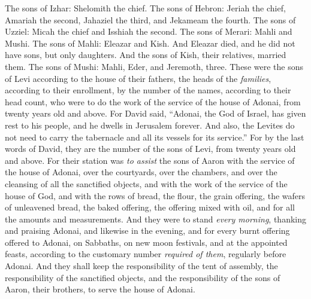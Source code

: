 \begin{biblechapter}
\verse The sons of Izhar: Shelomith the chief.
\verse The sons of Hebron: Jeriah the chief, Amariah the second, Jahaziel the third, and Jekameam the fourth.
\verse The sons of Uzziel: Micah the chief and Isshiah the second.
\verse The sons of Merari: Mahli and Mushi. The sons of Mahli: Eleazar and Kish.
\verse And Eleazar died, and he did not have sons, but only daughters. And the sons of Kish, their relatives, married them.
\verse The sons of Mushi: Mahli, Eder, and Jeremoth, three.
\verse These were the sons of Levi according to the house of their fathers, the heads of the \textit{families}, according to their enrollment, by the number of the names, according to their head count, who were to do the work of the service of the house of Adonai, from twenty years old and above.
\verse For David said, “Adonai, the God of Israel, has given rest to his people, and he dwells in Jerusalem forever.
\verse And also, the Levites do not need to carry the tabernacle and all its vessels for its service.”
\verse For by the last words of David, they are the number of the sons of Levi, from twenty years old and above.
\verse For their station was \textit{to assist} the sons of Aaron with the service of the house of Adonai, over the courtyards, over the chambers, and over the cleansing of all the sanctified objects, and with the work of the service of the house of God,
\verse and with the rows of bread, the flour, the grain offering, the wafers of unleavened bread, the baked offering, the offering mixed with oil, and for all the amounts and measurements.
\verse And they were to stand \textit{every morning}, thanking and praising Adonai, and likewise in the evening,
\verse and for every burnt offering offered to Adonai, on Sabbaths, on new moon festivals, and at the appointed feasts, according to the customary number \textit{required of them}, regularly before Adonai.
\verse And they shall keep the responsibility of the tent of assembly, the responsibility of the sanctified objects, and the responsibility of the sons of Aaron, their brothers, to serve the house of Adonai.
\end{biblechapter}

